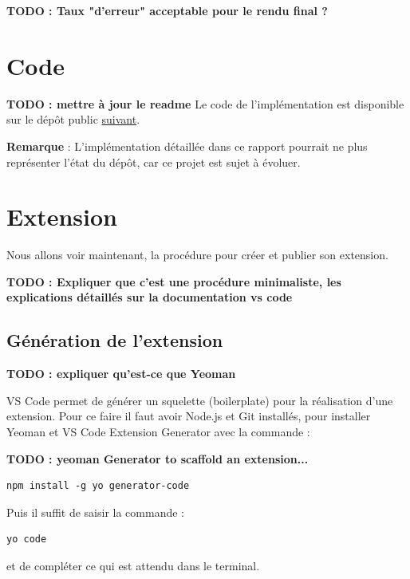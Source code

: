 \documentclass[
    iict, %
    il, %
]{heig-tb}
\begin{document}
\textbf{TODO : Taux "d'erreur" acceptable pour le rendu final ?}

\section{Code}
\textbf{TODO : mettre à jour le readme}
Le code de l'implémentation est disponible sur le dépôt public \href{https://github.com/vitorva/vscode-uon}{suivant}.

\textbf{Remarque} : L'implémentation détaillée dans ce rapport pourrait ne plus représenter l'état du dépôt, car ce projet est sujet à évoluer.

\section{Extension}
Nous allons voir maintenant, la procédure pour créer et publier son extension.

\textbf{TODO : Expliquer que c'est une procédure minimaliste, les explications détaillés sur la documentation vs code}

\subsection{Génération de l'extension}
\textbf{TODO : expliquer qu'est-ce que Yeoman}

VS Code permet de générer un squelette (boilerplate) pour la réalisation d'une extension. Pour ce faire il faut avoir Node.js et Git installés, pour installer Yeoman et VS Code Extension Generator avec la commande :

\textbf{TODO : yeoman Generator to scaffold an extension...}

\begin{lstlisting}[frame=single,caption={generator-code},label={generator-code}]
npm install -g yo generator-code
\end{lstlisting}

Puis il suffit de saisir la commande :

\begin{lstlisting}[frame=single]
yo code
\end{lstlisting}

et de compléter ce qui est attendu dans le terminal.
\end{document}
